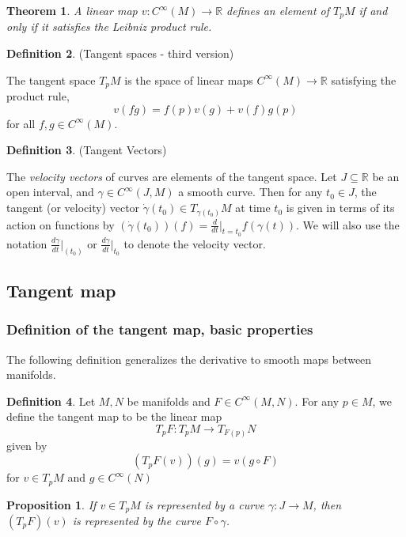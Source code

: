 \documentclass{article}
\newtheorem{theorem}{Theorem}[section]
\newtheorem{proposition}{Proposition}[theorem]
\theoremstyle{definition}
\newtheorem{defn}[theorem]{Definition}
\newenvironment{definition}
  {\vspace{8pt}\begin{mdframed}[backgroundcolor=blueish]\begin{defn}}
  {\end{defn}\end{mdframed}\vspace{4pt}}
\begin{document}
\begin{theorem}

A linear map $v : C^\infty(M) \rightarrow \mathbb R$ defines an element of $T_pM$ if and only if it satisfies the Leibniz product rule.
\end{theorem}

\begin{definition} (Tangent spaces - third version)

The tangent space $T_pM$ is the space of linear maps $C^\infty(M) \rightarrow \mathbb R$ satisfying the product rule, 
\[
    v(f g) = f(p)v(g) +v(f)g(p)
\]
for all $f,g \in C^\infty(M)$.
\end{definition}

\begin{definition} (Tangent Vectors)

The \textit{velocity vectors} of curves are elements of the tangent space. Let $J \subseteq \mathbb R$ be an open interval, and $\gamma \in C^\infty(J,M)$ a smooth curve. Then for any $t_0 \in J$, the tangent (or velocity) vector $\dot{\gamma}(t_0) \in T_{\gamma(t_0)}M$ at time $t_0$ is given in terms of its action on functions by $(\dot{\gamma}(t_0))(f) = \frac{d}{dt} \Bigr |_{t=t_0} f(\gamma(t))$. We will also use the notation $\frac{d\gamma}{dt} \Bigr|_(t_0)$ or $\frac{d\gamma}{dt} \Bigr |_{t_0}$ to denote the velocity vector.
\end{definition}

\subsection{Tangent map}
\subsubsection{Definition of the tangent map, basic properties}

The following definition generalizes the derivative to smooth maps between manifolds.

\begin{definition}

Let $M,N$ be manifolds and $F \in C^\infty(M,N)$. For any $p \in M$, we define the tangent map to be the linear map 
\[
    T_pF : T_pM \rightarrow T_{F(p)}N
\]
given by 
\[
    (T_{p}F(v))(g) = v(g \circ F) 
\]
for $v \in T_pM$ and $g \in C^\infty(N)$

\end{definition}

\begin{proposition}
If $v \in T_p M$ is represented by a curve $\gamma : J \rightarrow M$, then $(T_pF)(v)$ is represented by the curve $F\circ \gamma$.
\end{proposition}
\end{document}
